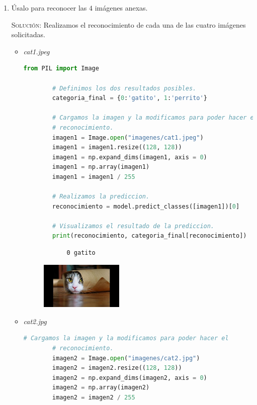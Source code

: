 \documentclass[letterpaper,11pt]{article}
\begin{document}
\begin{enumerate}
    \item Úsalo para reconocer las $4$ imágenes anexas.
    
    \textsc{Solución:} Realizamos el reconocimiento de cada una de las cuatro 
    imágenes solicitadas.
    \begin{itemize}
        \item \textit{cat1.jpeg}
        \begin{lstlisting}[language=Python]
        from PIL import Image

        # Definimos los dos resultados posibles.
        categoria_final = {0:'gatito', 1:'perrito'}

        # Cargamos la imagen y la modificamos para poder hacer el 
        # reconocimiento.
        imagen1 = Image.open("imagenes/cat1.jpeg")
        imagen1 = imagen1.resize((128, 128))
        imagen1 = np.expand_dims(imagen1, axis = 0)
        imagen1 = np.array(imagen1)
        imagen1 = imagen1 / 255

        # Realizamos la prediccion.
        reconocimiento = model.predict_classes([imagen1])[0]

        # Visualizamos el resultado de la prediccion.
        print(reconocimiento, categoria_final[reconocimiento])
        \end{lstlisting}

        \begin{verbatim}
            0 gatito
        \end{verbatim}

        \begin{figure}[ht]
            \centering
            \includegraphics[width=0.4\textwidth]{./src/imagenes/cat1.jpeg}
        \end{figure} 

        \newpage
        \item \textit{cat2.jpg}
        \begin{lstlisting}[language=Python]
        # Cargamos la imagen y la modificamos para poder hacer el 
        # reconocimiento.
        imagen2 = Image.open("imagenes/cat2.jpg")
        imagen2 = imagen2.resize((128, 128))
        imagen2 = np.expand_dims(imagen2, axis = 0)
        imagen2 = np.array(imagen2)
        imagen2 = imagen2 / 255


\end{lstlisting}
\end{itemize}
\end{enumerate}
\end{document}
